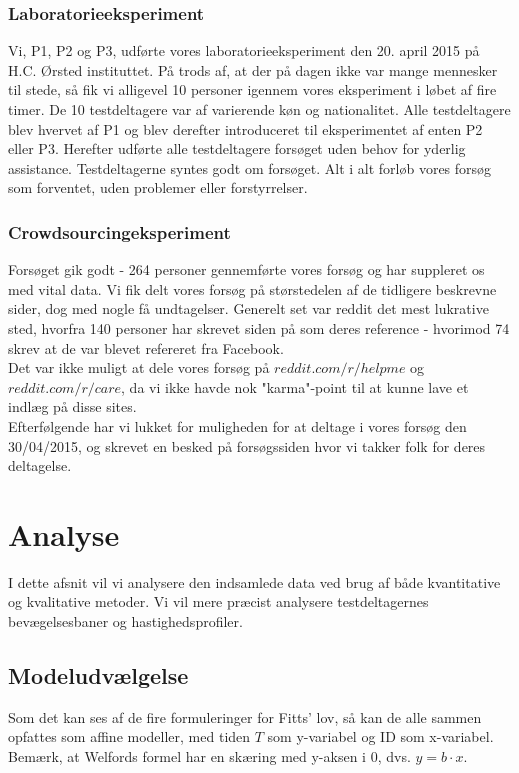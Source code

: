 \subsection*{Laboratorieeksperiment}
Vi, P1, P2 og P3, udførte vores laboratorieeksperiment den 20. april 2015 på H.C. Ørsted instituttet. På trods af, at der på dagen ikke var mange mennesker til stede, så fik vi alligevel 10 personer igennem vores eksperiment i løbet af fire timer. De 10 testdeltagere var af varierende køn og nationalitet. Alle testdeltagere blev hvervet af P1 og blev derefter introduceret til eksperimentet af enten P2 eller P3. Herefter udførte alle testdeltagere forsøget uden behov for yderlig assistance. Testdeltagerne syntes godt om forsøget. Alt i alt forløb vores forsøg som forventet, uden problemer eller forstyrrelser.

\subsection*{Crowdsourcingeksperiment}
Forsøget gik godt - 264 personer gennemførte vores forsøg og har suppleret os med vital data. Vi fik delt vores forsøg på størstedelen af de tidligere beskrevne sider, dog med nogle få undtagelser. Generelt set var reddit det mest lukrative sted, hvorfra 140 personer har skrevet siden på som deres reference - hvorimod 74 skrev at de var blevet refereret fra Facebook.\\
Det var ikke muligt at dele vores forsøg på $reddit.com/r/helpme$ og $reddit.com/r/care$, da vi ikke havde nok "karma"-point til at kunne lave et indlæg på disse sites.\\
Efterfølgende har vi lukket for muligheden for at deltage i vores forsøg den 30/04/2015, og skrevet en besked på forsøgssiden hvor vi takker folk for deres deltagelse.

\chapter*{Analyse}
I dette afsnit vil vi analysere den indsamlede data ved brug af både kvantitative og kvalitative metoder. Vi vil mere præcist analysere testdeltagernes bevægelsesbaner og hastighedsprofiler. 
\section*{Modeludvælgelse}
Som det kan ses af de fire formuleringer for Fitts' lov, så kan de alle sammen opfattes som affine modeller, med tiden $T$ som y-variabel og ID som x-variabel. Bemærk, at Welfords formel har en skæring med y-aksen i 0, dvs. $y=b\cdot x$.

